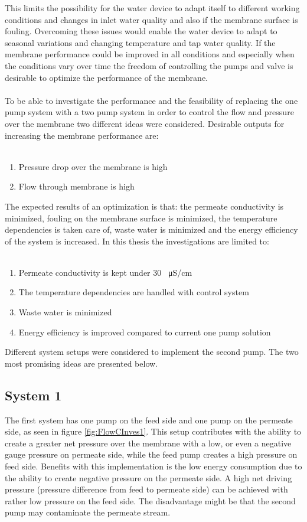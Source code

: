 This limits the possibility for the water device to adapt itself to different working conditions and changes in inlet water quality and also if the membrane surface is fouling. Overcoming these issues would enable the water device to adapt to seasonal variations and changing temperature and tap water quality. If the membrane performance could be improved in all conditions and especially when the conditions vary over time the freedom of controlling the pumps and valve is desirable to optimize the performance of the membrane. \\
\\
To be able to investigate the performance and the feasibility of replacing the one pump system with a two pump system in order to control the flow and pressure over the membrane two different ideas were considered. Desirable outputs for increasing the membrane performance are:\\
\\
\begin{enumerate}
\item Pressure drop over the membrane is high
\item Flow through membrane is high
\end{enumerate}
The expected results of an optimization is that: the permeate conductivity is minimized, fouling on the membrane surface is minimized, the temperature dependencies is taken care of, waste water is minimized and the energy efficiency of the system is increased. In this thesis the investigations are limited to:\\
\\
\begin{enumerate}
\item Permeate conductivity is kept under 30 \SI{}{\micro\siemens}/cm
\item The temperature dependencies are handled with control system
\item Waste water is minimized
\item Energy efficiency is improved compared to current one pump solution
\end{enumerate}
Different system setups were considered to implement the second pump. The two most promising ideas are presented below.

\subsection{System 1}
The first system has one pump on the feed side and one pump on the permeate side, as seen in figure \ref{fig:FlowCInves1}. This setup contributes with the ability to create a greater net pressure over the membrane with a low, or even a negative gauge pressure on permeate side, while the feed pump creates a high pressure on feed side. Benefits with this implementation is the low energy consumption due to the ability to create negative pressure on the permeate side. A high net driving pressure (pressure difference from feed to permeate side) can be achieved with rather low pressure on the feed side. The disadvantage might be that the second pump may contaminate the permeate stream. 

